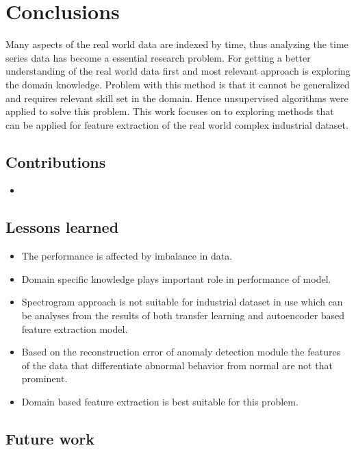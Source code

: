 

    \chapter{Conclusions}
Many aspects of the real world data are indexed by time, thus analyzing the time series data has become a essential research problem. For getting a better understanding of the real world data first and most relevant approach is exploring the domain knowledge. Problem with this method is that it cannot be generalized and requires relevant skill set in the domain. Hence unsupervised algorithms were applied to solve this problem. This work focuses on to exploring methods that can be applied for feature extraction of the real world complex industrial dataset.



    \section{Contributions}
    \begin{itemize}
    \item 	
    \end{itemize}
    
    
    \section{Lessons learned}
    \begin{itemize}
    	\item The performance is affected by imbalance in data.
    	\item Domain specific knowledge plays important role in performance of model.
    	\item Spectrogram approach is not suitable for industrial dataset in use which can be analyses from the results of both transfer learning and autoencoder based feature extraction model.
    	\item Based on the reconstruction error of anomaly detection module the features of the data that differentiate abnormal behavior from normal are not that prominent.
    	\item Domain based feature extraction is best suitable for this problem.
    \end{itemize}

    \section{Future work}

